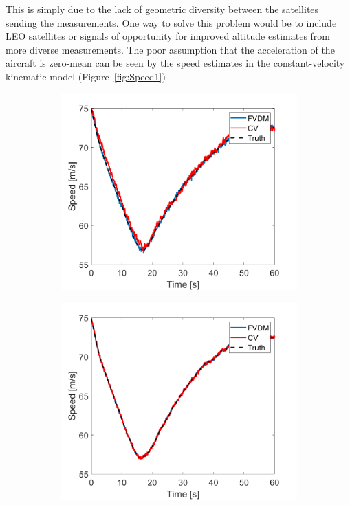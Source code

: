 This is simply due to the lack of geometric diversity between the satellites sending the measurements. One way to solve this problem would be to include LEO satellites or signals of opportunity for improved altitude estimates from more diverse measurements. The poor assumption that the acceleration of the aircraft is zero-mean can be seen by the speed estimates in the constant-velocity kinematic model (Figure~\ref{fig:Speed1})

\begin{figure}[!ht]
    \begin{subfigure}{.45\textwidth}
        \centering
        \includegraphics[width=1\linewidth]{Figures/straight/20/SPEED.png}
    \end{subfigure}
    \begin{subfigure}{.45\textwidth}
        \centering
        \includegraphics[width=1\linewidth]{Figures/straight/25/SPEED.png}

\end{subfigure}
\end{figure}
